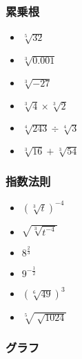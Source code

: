 \documentclass[10pt,dvipdfmx]{jsarticle}
\begin{document}
\subsubsection*{累乗根}
\begin{multicols}{3}
  \begin{Large}
    \begin{itemize}
      \item $\sqrt[5]{32}$
      \item $\sqrt[3]{0.001}$
      \item $\sqrt[3]{-27}$
      \item $\sqrt[3]{4}\times\sqrt[3]{2}$
      \item $\sqrt[4]{243}\div\sqrt[4]{3}$
      \item $\sqrt[3]{16}+\sqrt[3]{54}$
    \end{itemize}
  \end{Large}
\end{multicols}

\subsubsection*{指数法則}
\begin{multicols}{3}
  \begin{Large}
    \begin{itemize}
      \item $(\sqrt[3]{t})^{-4}$
      \item $\sqrt{\sqrt[3]{t^{-4}}}$
      \item $8^{\frac{2}{3}}$
      \item $9^{-\frac{1}{2}}$
      \item $(\sqrt[6]{49})^3$
      \item $\sqrt[5]{\sqrt[]{1024}}$
    \end{itemize}
  \end{Large}
\end{multicols}

\subsubsection*{グラフ}
\end{document}
